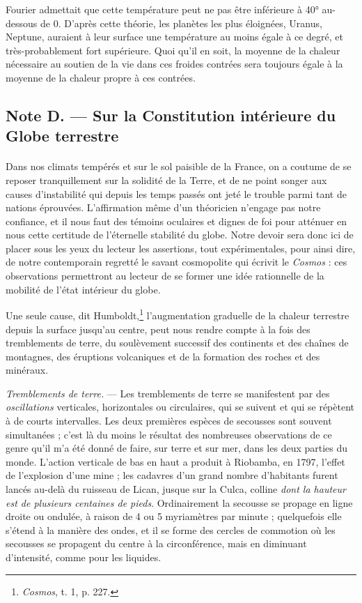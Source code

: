 \documentclass[a4paper, 11pt, oneside]{article}
\begin{document}
Fourier admettait que cette température peut ne pas être inférieure à 40° au-dessous de 0. D'après cette théorie, les planètes les plus éloignées, Uranus, Neptune, auraient à leur surface une température au moins égale à ce degré, et très-probablement fort supérieure. Quoi qu'il en soit, la moyenne de la chaleur nécessaire au soutien de la vie dans ces froides contrées sera toujours égale à la moyenne de la chaleur propre à ces contrées.
\clearpage
\subsection{Note D. --- Sur la Constitution intérieure du Globe terrestre}
\paragraph{}
Dans nos climats tempérés et sur le sol paisible de la France, on a coutume de se reposer tranquillement sur la solidité de la Terre, et de ne point songer aux causes d'instabilité qui depuis les temps passés ont jeté le trouble parmi tant de nations éprouvées. L'affirmation même d'un théoricien n'engage pas notre confiance, et il nous faut des témoins oculaires et dignes de foi pour atténuer en nous cette certitude de l'éternelle stabilité du globe. Notre devoir sera donc ici de placer sous les yeux du lecteur les assertions, tout expérimentales, pour ainsi dire, de notre contemporain regretté le savant cosmopolite qui écrivit le \emph{Cosmos} : ces observations permettront au lecteur de se former une idée rationnelle de la mobilité de l'état intérieur du globe.

Une seule cause, dit Humboldt,\footnote{\emph{Cosmos}, t. 1, p. 227.} l'augmentation graduelle de la chaleur terrestre depuis la surface jusqu'au centre, peut nous rendre compte à la fois des tremblements de terre, du soulèvement successif des continents et des chaînes de montagnes, des éruptions volcaniques et de la formation des roches et des minéraux.

\emph{Tremblements de terre.} --- Les tremblements de terre se manifestent par des \emph{oscillations} verticales, horizontales ou circulaires, qui se suivent et qui se répètent à de courts intervalles. Les deux premières espèces de secousses sont souvent simultanées ; c'est là du moins le résultat des nombreuses observations de ce genre qu'il m'a été donné de faire, sur terre et sur mer, dans les deux parties du monde. L'action verticale de bas en haut a produit à Riobamba, en 1797, l'effet de l'explosion d'une mine ; les cadavres d'un grand nombre d'habitants furent lancés au-delà du ruisseau de Lican, jusque sur la Culca, colline \emph{dont la hauteur est de plusieurs centaines de pieds}. Ordinairement la secousse se propage en ligne droite ou ondulée, à raison de 4 ou 5 myriamètres par minute ; quelquefois elle s'étend à la manière des ondes, et il se forme des cercles de commotion où les secousses se propagent du centre à la circonférence, mais en diminuant d'intensité, comme pour les liquides.
\end{document}
